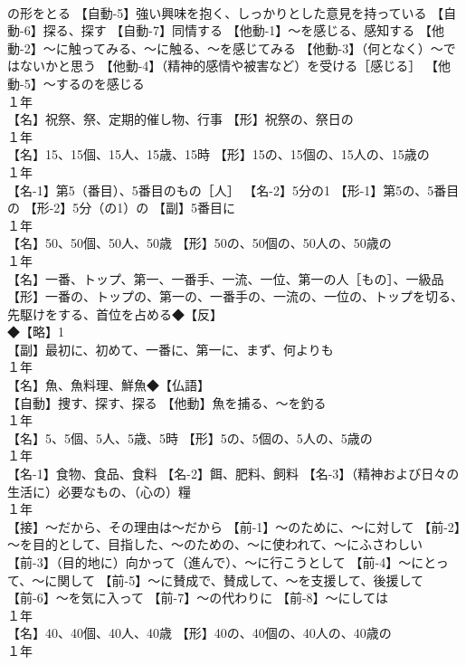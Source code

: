 \documentclass[8pt]{extreport}
\begin{document}
\begin{CJK}{UTF8}{min}
\\	の形をとる 【自動-5】強い興味を抱く、しっかりとした意見を持っている 【自動-6】探る、探す 【自動-7】同情する 【他動-1】～を感じる、感知する 【他動-2】～に触ってみる、～に触る、～を感じてみる 【他動-3】（何となく）～ではないかと思う 【他動-4】（精神的感情や被害など）を受ける［感じる］ 【他動-5】～するのを感じる
\\	１年	
\\	【名】祝祭、祭、定期的催し物、行事 【形】祝祭の、祭日の
\\	１年	
\\	【名】15、15個、15人、15歳、15時 【形】15の、15個の、15人の、15歳の
\\	１年	
\\	【名-1】第5（番目）、5番目のもの［人］ 【名-2】5分の1 【形-1】第5の、5番目の 【形-2】5分（の1）の 【副】5番目に
\\	１年	
\\	【名】50、50個、50人、50歳 【形】50の、50個の、50人の、50歳の
\\	１年	
\\	【名】一番、トップ、第一、一番手、一流、一位、第一の人［もの］、一級品 【形】一番の、トップの、第一の、一番手の、一流の、一位の、トップを切る、先駆けをする、首位を占める◆【反】
\\	◆【略】1
\\	【副】最初に、初めて、一番に、第一に、まず、何よりも
\\	１年	
\\	【名】魚、魚料理、鮮魚◆【仏語】
\\	【自動】捜す、探す、探る 【他動】魚を捕る、～を釣る
\\	１年	
\\	【名】5、5個、5人、5歳、5時 【形】5の、5個の、5人の、5歳の
\\	１年	
\\	【名-1】食物、食品、食料 【名-2】餌、肥料、飼料 【名-3】（精神および日々の生活に）必要なもの、（心の）糧
\\	１年	
\\	【接】～だから、その理由は～だから 【前-1】～のために、～に対して 【前-2】～を目的として、目指した、～のための、～に使われて、～にふさわしい 【前-3】（目的地に）向かって（進んで）、～に行こうとして 【前-4】～にとって、～に関して 【前-5】～に賛成で、賛成して、～を支援して、後援して 【前-6】～を気に入って 【前-7】～の代わりに 【前-8】～にしては
\\	１年	
\\	【名】40、40個、40人、40歳 【形】40の、40個の、40人の、40歳の
\\	１年	

\end{CJK}
\end{document}
